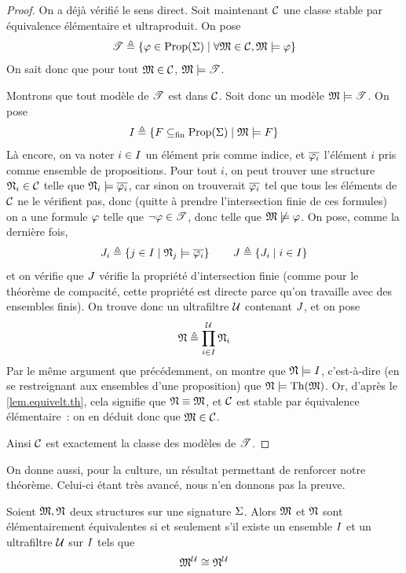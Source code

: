 \begin{proof}
  On a déjà vérifié le sens direct. Soit maintenant $\mathcal{C}$ une classe
  stable par équivalence élémentaire et ultraproduit. On pose
  \[\mathscr T \triangleq
  \left\{ \varphi\in\operatorname{Prop}(\Sigma) \;\middle\vert\; \forall \mathfrak{M}\in\mathcal{C},\mathfrak{M}\models\varphi \right\}\]
  On sait donc que pour tout $\mathfrak{M}\in\mathcal{C}$, $\mathfrak{M}\models \mathscr T$.
  
  Montrons que tout modèle de $\mathscr T$ est dans $\mathcal{C}$. Soit donc un modèle
  $\mathfrak{M}\models\mathscr T$. On pose
  \[I \triangleq \left\{ F \subseteq_{\mathrm{fin}} \operatorname{Prop}(\Sigma) \;\middle\vert\; \mathfrak{M}\models F \right\}\]
  Là encore, on va noter $i \in I$ un élément pris comme indice, et
  $\overline{\varphi_i}$ l'élément $i$ pris comme ensemble de propositions.
  Pour tout $i$, on peut trouver une structure $\mathfrak{N}_i\in\mathcal{C}$ telle que
  $\mathfrak{N}_i\models\overline{\varphi_i}$, car sinon on trouverait $\overline{\varphi_i}$
  tel que tous les éléments de $\mathcal{C}$ ne le vérifient pas, donc (quitte à
  prendre l'intersection finie de ces formules) on a une formule
  $\varphi$ telle que $\lnot\varphi\in\mathscr T$, donc telle que
  $\mathfrak{M}\not\models\varphi$. On pose, comme la dernière fois,
  \[J_i \triangleq \left\{ j \in I \;\middle\vert\; \mathfrak{N}_j\models\overline{\varphi_i} \right\}\qquad
  J \triangleq \left\{ J_i \;\middle\vert\; i \in I \right\}\]
  et on vérifie que $J$ vérifie la propriété d'intersection finie (comme
  pour le théorème de compacité, cette propriété est directe parce qu'on
  travaille avec des ensembles finis). On trouve donc un ultrafiltre $\mathcal{U}$
  contenant $J$, et on pose
  \[\mathfrak{N}\triangleq \prod_{i \in I}^{\mathcal{U}} \mathfrak{N}_i\]
  Par le même argument que précédemment, on montre que $\mathfrak{N}\models I$,
  c'est-à-dire (en se restreignant aux ensembles d'une proposition) que
  $\mathfrak{N}\models\operatorname{Th}(\mathfrak{M})$. Or, d'après le \cref{lem.equivelt.th}, cela
  signifie que $\mathfrak{N}\equiv\mathfrak{M}$, et $\mathcal{C}$ est stable par équivalence
  élémentaire~: on en déduit donc que $\mathfrak{M}\in\mathcal{C}$.

  Ainsi $\mathcal{C}$ est exactement la classe des modèles de $\mathscr T$.
\end{proof}

On donne aussi, pour la culture, un résultat permettant de renforcer notre
théorème. Celui-ci étant très avancé, nous n'en donnons pas la preuve.

\begin{theorem}
  Soient $\mathfrak{M},\mathfrak{N}$ deux structures sur une signature $\Sigma$. Alors
  $\mathfrak{M}$ et $\mathfrak{N}$ sont élémentairement équivalentes si et seulement s'il
  existe un ensemble $I$ et un ultrafiltre $\mathcal{U}$ sur $I$ tels
  que
  \[\mathfrak{M}^{\mathcal{U}} \cong \mathfrak{N}^{\mathcal{U}}\]
\end{theorem}

